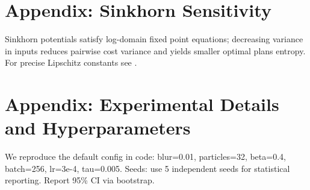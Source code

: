 \documentclass{article}
\begin{document}
\section{Appendix: Sinkhorn Sensitivity}
Sinkhorn potentials satisfy log-domain fixed point equations; decreasing variance in inputs reduces pairwise cost variance and yields smaller optimal plans entropy. For precise Lipschitz constants see \cite{feydy2019interpolating}.

\section{Appendix: Experimental Details and Hyperparameters}
We reproduce the default config in code: blur=0.01, particles=32, beta=0.4, batch=256, lr=3e-4, tau=0.005. Seeds: use 5 independent seeds for statistical reporting. Report 95\% CI via bootstrap.
\end{document}
